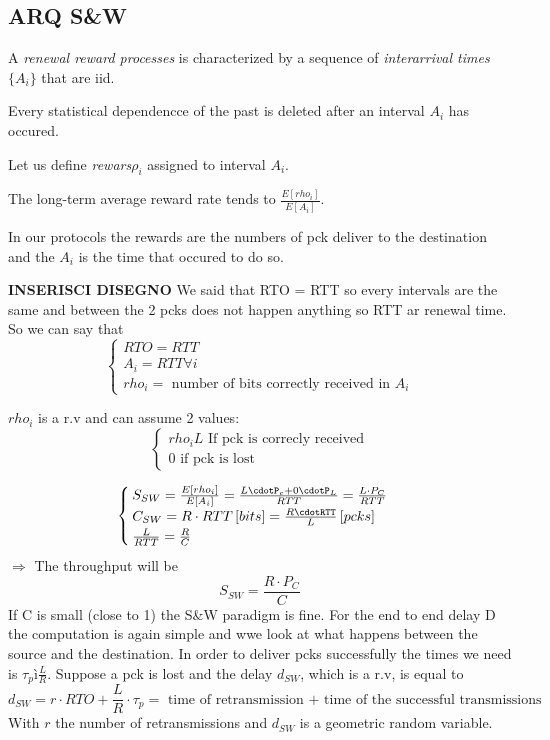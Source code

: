 \begin{itemize}
\subsection{ARQ S&W}
A \emph{renewal reward processes} is characterized by a sequence of \emph{interarrival times}$\{A_i\}$ that are iid. 

Every statistical dependencce of the past is deleted after an interval $A_i$ has occured.

Let us define \emph{rewars}$\rho_i$ assigned to interval $A_i$.

The long-term average reward rate tends to $\frac{E[rho_i]}{E[A_i]}$. 

In our protocols the rewards are the numbers of pck deliver to the destination and the $A_i$ is the time that occured to do so. 


\textbf{INSERISCI DISEGNO}
We said that RTO = RTT so every intervals are the same and between the 2 pcks does not happen anything so RTT ar renewal time. 
So we can say that
\begin{equation}
\begin{cases}
RTO = RTT\\
A_i = RTT \forall i\\
rho_i = \text{ number of bits correctly received in }A_i
\end{cases}
\end{equation}

$rho_i$ is a r.v and can assume 2 values:
\begin{equation}
\begin{cases}{rho_i}
L \text{ If pck is correcly received}\\
0 \text{ if pck is lost}
\end{cases}
\end{equation}


\begin{equation}
\begin{cases}
S_{SW} = \frac{E[rho_i]}{E[A_i]} = \frac{L\cdotP_c + 0\cdotP_L}{RTT} = \frac{L\cdot P_C}{RTT}\\
C_{SW} = R\cdot RTT\, [bits] = \frac{R\cdotRTT}{L}\, [pcks]\\
\frac{L}{RTT} = \frac{R}{C} 
\end{cases}
\end{equation}
$\Rightarrow$ The throughput will be
\begin{equation}
S_{SW} = \frac{R\cdot P_C}{C}
\end{equation}
If C is small (close to 1) the S&W paradigm is fine. 
For the end to end delay D the computation is again simple and wwe look at what happens between the source and the destination. In order to deliver pcks successfully the times we need is $\tau_p ì \frac{L}{R}$. Suppose a pck is lost and the delay $d_{SW}$, which is a r.v, is equal to
\begin{equation}
d_{SW}= r \cdot RTO + \frac{L}{R}\cdot \tau_p = \text{ time of retransmission + time of the successful transmissions}
\end{equation}  
With $r$ the number of retransmissions and $d_{SW}$ is a geometric random variable.


\end{itemize}
